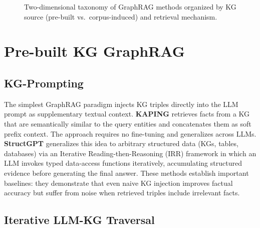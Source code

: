 \documentclass[11pt]{article}
\begin{document}
\begin{figure}[t]
\caption{Two-dimensional taxonomy of GraphRAG methods organized by KG source (pre-built vs.\ corpus-induced) and retrieval mechanism.}
\label{fig:taxonomy}
\end{figure}

\section{Pre-built KG GraphRAG}
\label{sec:prebuilt}

\subsection{KG-Prompting}
\label{sec:prompting}

The simplest GraphRAG paradigm injects KG triples directly into the LLM prompt as supplementary textual context. \textbf{KAPING} \cite{baek2023kaping} retrieves facts from a KG that are semantically similar to the query entities and concatenates them as soft prefix context. The approach requires no fine-tuning and generalizes across LLMs. \textbf{StructGPT} \cite{jiang2023structgpt} generalizes this idea to arbitrary structured data (KGs, tables, databases) via an Iterative Reading-then-Reasoning (IRR) framework in which an LLM invokes typed data-access functions iteratively, accumulating structured evidence before generating the final answer. These methods establish important baselines: they demonstrate that even naive KG injection improves factual accuracy but suffer from noise when retrieved triples include irrelevant facts.

\subsection{Iterative LLM-KG Traversal}
\label{sec:traversal}
\end{document}
